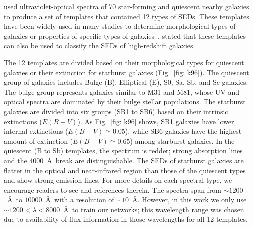      used ultraviolet-optical spectra of 70 star-forming and quiescent nearby galaxies to produce a set of templates that contained 12 types of SEDs.
    These templates have been widely used in many studies to determine morphological types of galaxies or properties of specific types of galaxies~\citep[e.g.][]{Shakouri16, Paiano16, Laporte16, Holden16}.
     stated that these templates can also be used to classify the SEDs of high-redshift galaxies. 
    
    The 12 templates are divided based on their morphological types for quiescent galaxies or their extinction for starburst galaxies (Fig.~\ref{fig: k96}). 
    The quiescent group of galaxies includes Bulge (B), Elliptical (E), S0, Sa, Sb, and Sc galaxies.
    The bulge group represents galaxies similar to M31 and M81, whose UV and optical spectra are dominated by their bulge stellar populations.
    The starburst galaxies are divided into six groups (SB1 to SB6) based on their intrinsic extinctions ($E(B-V)$). 
    As Fig.~\ref{fig: k96} shows, SB1 galaxies have lower internal extinctions ($E(B-V) \simeq 0.05$), while SB6 galaxies have the highest amount of extinction ($E(B-V) \simeq 0.65$) among starburst galaxies. 
    In the quiescent (B to Sb) templates, the spectrum is redder; strong absorption lines and the 4000~\AA~break are distinguishable.
    The SEDs of starburst galaxies are flatter in the optical and near-infrared region than those of the quiescent types and show strong emission lines.
    For more details on each spectral type, we encourage readers to see  and references therein. 
   The  spectra span from $\sim1200$~\AA~to $10000$~\AA~with a resolution of $\sim 10$~\AA.
    However, in this work we only use $\sim1200< \lambda < 8000$~\AA~to train our networks; 
    this wavelength range was chosen due to availability of flux information in those wavelengths for all 12 templates. 

